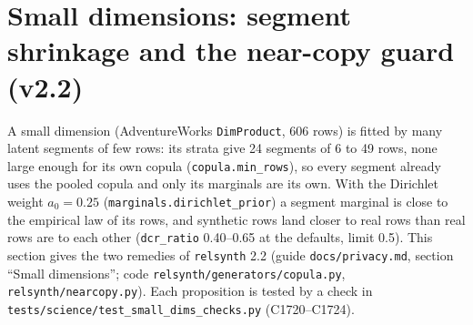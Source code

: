 \section{Small dimensions: segment shrinkage and the near-copy guard (v2.2)}\label{sec:g3small}
\setcounter{savedpropgthree}{\value{proposition}}
A small dimension (AdventureWorks \texttt{DimProduct}, 606 rows) is fitted by many latent segments of few rows: its strata give 24 segments of 6 to 49 rows, none large enough for its own copula (\texttt{copula.min\_rows}), so every segment already uses the pooled copula and only its marginals are its own. With the Dirichlet weight $a_0=0.25$ (\texttt{marginals.dirichlet\_prior}) a segment marginal is close to the empirical law of its rows, and synthetic rows land closer to real rows than real rows are to each other (\texttt{dcr\_ratio} 0.40--0.65 at the defaults, limit 0.5). This section gives the two remedies of \texttt{relsynth} 2.2 (guide \texttt{docs/privacy.md}, section ``Small dimensions''; code \texttt{relsynth/generators/copula.py}, \texttt{relsynth/nearcopy.py}). Each proposition is tested by a check in \texttt{tests/science/test\_small\_dims\_checks.py} (C1720--C1724).

